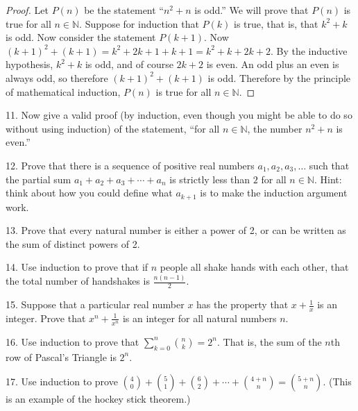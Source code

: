 \documentclass[10pt,]{book}
\theoremstyle{plain}
\theoremstyle{definition}
\theoremstyle{definition}
\theoremstyle{definition}
\numberwithin{equation}{chapter}
\def\d{\displaystyle}
\def\N{\mathbb N}
\begin{document}
\begin{exerciselist}
\begin{proof}
Let \(P(n)\) be the statement ``\(n^2 + n\) is odd.'' We will prove that \(P(n)\) is true for all \(n \in \N\). Suppose for induction that \(P(k)\) is true, that is, that \(k^2 + k\) is odd. Now consider the statement \(P(k+1)\). Now \((k+1)^2 + (k+1) = k^2 + 2k + 1 + k + 1 = k^2 + k + 2k + 2\). By the inductive hypothesis, \(k^2 + k\) is odd, and of course \(2k + 2\) is even. An odd plus an even is always odd, so therefore \((k+1)^2 + (k+1)\) is odd. Therefore by the principle of mathematical induction, \(P(n)\) is true for all \(n \in \N\).
%
\end{proof}
\par\smallskip
\item[11.]\hypertarget{exercise-178}{}
Now give a valid proof (by induction, even though you might be able to do so without using induction) of the statement, ``for all \(n \in \N\), the number \(n^2 + n\) is even.''
%
\par\smallskip
\item[12.]\hypertarget{exercise-179}{}
Prove that there is a sequence of positive real numbers \(a_1, a_2, a_3, \ldots\) such that the partial sum \(a_1 + a_2 + a_3 + \cdots + a_n\) is strictly less than \(2\) for all \(n \in \N\). Hint: think about how you could define what \(a_{k+1}\) is to make the induction argument work.
%
\par\smallskip
\item[13.]\hypertarget{exercise-180}{}
Prove that every natural number is either a power of 2, or can be written as the sum of distinct powers of 2.
%
\par\smallskip
\item[14.]\hypertarget{exercise-181}{}
Use induction to prove that if \(n\) people all shake hands with each other, that the total number of handshakes is \(\frac{n(n-1)}{2}\).
%
\par\smallskip
\item[15.]\hypertarget{exercise-182}{}
Suppose that a particular real number \(x\) has the property that \(x + \frac{1}{x}\) is an integer. Prove that \(x^n + \frac{1}{x^n}\) is an integer for all natural numbers \(n\).
%
\par\smallskip
\item[16.]\hypertarget{exercise-183}{}
Use induction to prove that \(\d\sum_{k=0}^n {n \choose k} = 2^n\). That is, the sum of the \(n\)th row of Pascal's Triangle is \(2^n\).
%
\par\smallskip
\item[17.]\hypertarget{exercise-184}{}
Use induction to prove \({4 \choose 0} + {5 \choose 1} + {6 \choose 2} + \cdots + {4+n \choose n} = {5+n \choose n}\). (This is an example of the hockey stick theorem.)

\end{exerciselist}
\end{document}
